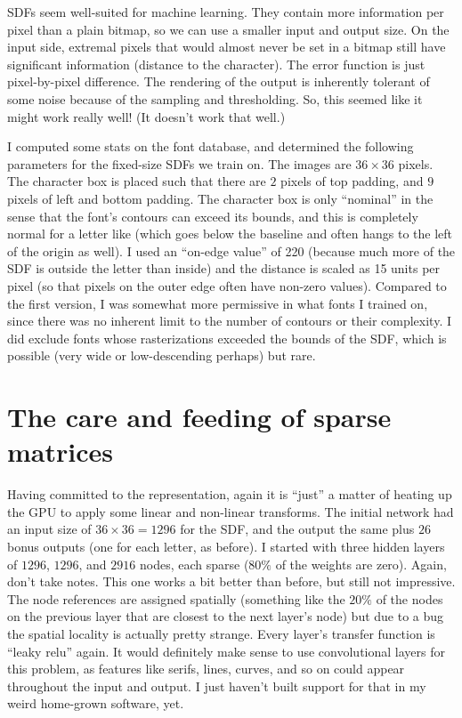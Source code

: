 \documentclass[twocolumn]{article} %
\begin{document}
SDFs seem well-suited for machine learning. They contain more
information per pixel than a plain bitmap, so we can use a smaller
input and output size. On the input side, extremal pixels that would
almost never be set in a bitmap still have significant information
(distance to the character). The error function is just pixel-by-pixel
difference. The rendering of the output is inherently tolerant of some
noise because of the sampling and thresholding. So, this seemed like
it might work really well! (It doesn't work that well.)

I computed some stats on the font database, and determined the
following parameters for the fixed-size SDFs we train on. The images
are $36 \times 36$ pixels. The character box is placed such that there
are $2$ pixels of top padding, and $9$ pixels of left and bottom
padding. The character box is only ``nominal'' in the sense that the
font's contours can exceed its bounds, and this is completely normal
for a letter like  (which goes below the baseline and
often hangs to the left of the origin as well). I used an ``on-edge
value'' of 220 (because much more of the SDF is outside the letter
than inside) and the distance is scaled as 15 units per pixel (so that
pixels on the outer edge often have non-zero values). Compared to the
first version, I was somewhat more permissive in what fonts I trained
on, since there was no inherent limit to the number of contours or their
complexity. I did exclude fonts whose rasterizations exceeded the
bounds of the SDF, which is possible (very wide  or
low-descending  perhaps) but rare.

\section{The care and feeding of sparse matrices} \label{sec:neural}

Having committed to the representation, again it is ``just'' a matter
of heating up the GPU to apply some linear and non-linear transforms.
The initial network had an input size of $36 \times 36 = 1296$ for the
SDF, and the output the same plus $26$ bonus outputs (one for each
letter, as before). I started with three hidden layers of $1296$, $1296$,
and $2916$ nodes, each sparse ($80\%$ of the weights are zero). Again,
don't take notes. This one works a bit better than before, but still
not impressive. The node references are assigned spatially (something
like the $20\%$ of the nodes on the previous layer that are closest to
the next layer's node) but due to a bug the spatial locality is
actually pretty strange.
Every layer's transfer function is ``leaky relu'' again. It would
definitely make sense to use convolutional layers for this problem, as
features like serifs, lines, curves, and so on could appear throughout
the input and output. I just haven't built support for that in my
weird home-grown software, yet.
\end{document}
